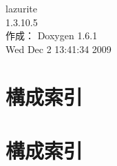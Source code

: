 \documentclass[a4paper]{book}
\begin{document}
\hypersetup{pageanchor=false}
\begin{titlepage}
\vspace*{7cm}
\begin{center}
{\Large lazurite \\[1ex]\large 1.3.10.5 }\\
\vspace*{1cm}
{\large 作成： Doxygen 1.6.1}\\
\vspace*{0.5cm}
{\small Wed Dec 2 13:41:34 2009}\\
\end{center}
\end{titlepage}
\clearemptydoublepage
{}
\tableofcontents
\clearemptydoublepage
{}
\hypersetup{pageanchor=true}
\chapter{構成索引}

\chapter{構成索引}

\end{document}
